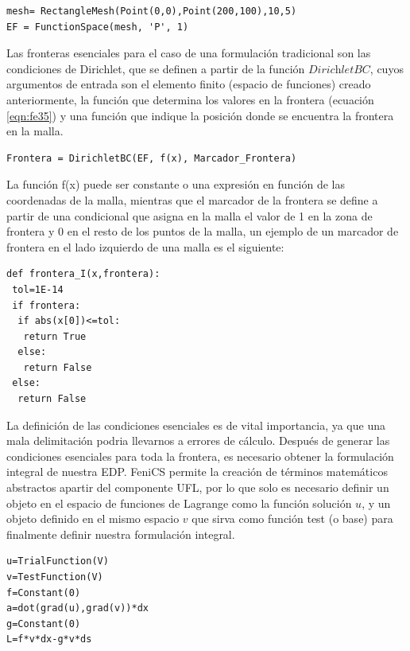 \lstset{language=python,breaklines=true,belowskip=1.3em, aboveskip=2em\footnotesize}
\begin{lstlisting}[frame=single]
mesh= RectangleMesh(Point(0,0),Point(200,100),10,5)
EF = FunctionSpace(mesh, 'P', 1)
\end{lstlisting}
    
Las fronteras esenciales para el caso de una formulación tradicional son las condiciones de Dirichlet, que se definen a partir 
de la función $\textit{DirichletBC}$, cuyos argumentos de entrada son el elemento finito (espacio de funciones) creado anteriormente, la función que determina los valores en la frontera (ecuación \ref{eqn:fe35}) y una función que indique la posición donde se encuentra la frontera en la malla.

\lstset{language=python,breaklines=true, basicstyle=\footnotesize}
\begin{lstlisting}[frame=single]
Frontera = DirichletBC(EF, f(x), Marcador_Frontera)
\end{lstlisting}

La función f(x) puede ser constante o una expresión en función de las coordenadas de la malla, mientras que el marcador de la frontera se define a partir de una condicional que asigna en la malla el valor de 1 en la zona de frontera y 0 en el resto de los puntos de la malla, un ejemplo de un marcador de frontera en el lado izquierdo de una malla es el siguiente:

\lstset{language=python,breaklines=true, basicstyle=\footnotesize}
\begin{lstlisting}[frame=single]
def frontera_I(x,frontera):
 tol=1E-14 
 if frontera:
  if abs(x[0])<=tol: 
   return True
  else:
   return False 
 else:
  return False
\end{lstlisting}

La definición de las condiciones esenciales es de vital importancia, ya que una mala delimitación podria llevarnos a errores de cálculo. Después de generar las condiciones esenciales para toda la frontera, es necesario obtener la formulación integral de nuestra EDP. FeniCS permite la creación de términos matemáticos abstractos apartir del componente UFL, por lo que solo es necesario definir un objeto en el espacio de funciones de Lagrange como la función solución $u$, y un objeto definido en el mismo espacio $v$ que sirva como función  test (o base) para finalmente definir nuestra formulación integral.

\lstset{language=python,breaklines=true, basicstyle=\footnotesize}
\begin{lstlisting}[frame=single]
u=TrialFunction(V)
v=TestFunction(V)
f=Constant(0)
a=dot(grad(u),grad(v))*dx
g=Constant(0)
L=f*v*dx-g*v*ds
\end{lstlisting}

